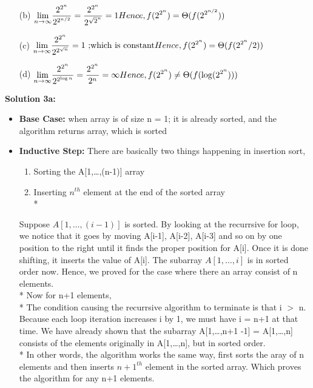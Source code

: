 \documentclass{article}
\theoremstyle{definition}
\begin{document}
\begin{itemize}
\begin{enumerate}
				\item[(b)] $\displaystyle{\lim_{n \to \infty}} \frac {2^{2^{n}}}{2^{2^{n/2}}} = \frac {2^{2^{n}}}{2^{\sqrt 2 ^{n}}} = 1 \bigskip\\*
				 Hence, f(2^{2^{n}}) = \Theta(f(2^{2^{n/2}}))$
				\item[(c)] $\displaystyle{\lim_{n \to \infty}} \frac {2^{2^{n}}}{2^{2^{\sqrt n}}} = 1  {\text{ ;which is constant}} \bigskip\\*
				 Hence, f(2^{2^{n}}) = \Theta(f(2^{2^{n}}/2))$
				\item[(d)] $\displaystyle{\lim_{n \to \infty}} \frac {2^{2^{n}}}{2^{2^{\log n}}} =  \frac {2^{2^{n}}}{2^{n}} = \infty \bigskip\\*
				 Hence, f(2^{2^{n}}) \neq \Theta(f(\log (2^{2^{n}})))$
		          \end{enumerate}
  	 \end{itemize}

\textbf{Solution 3a:} 
	\begin{itemize}
		\item \textbf{Base Case:} when array is of size n = 1; it is already sorted, and the algorithm returns array, which is sorted
		\item \textbf{Inductive Step:}
			There are basically two things happening in insertion sort,
			\begin{enumerate}
				\item Sorting the A[1,\ldots,(n-1)] array
				\item Inserting $n^{th}$ element at the end of the sorted array \\*
			\end{enumerate}
		Suppose $A[1,\ldots,(i-1)]$ is sorted. By looking at the recurrsive for loop, we notice that it goes by moving A[i-1], A[i-2], A[i-3] and so on by one position to the right until it finds the proper position for A[i]. Once it is done shifting, it inserts the value of A[i]. The subarray $A[1,\ldots,i]$ is in sorted order now. Hence, we proved for the case where there an array consist of n elements.\bigskip\\*
		Now for n+1 elements, \\*
		The condition causing the recurrsive algorithm to terminate is that i $>$ n. Because each loop iteration increases i by 1, we must have i = n+1 at that time. We have already shown that the subarray A[1,\ldots,n+1 -1] = A[1,\ldots,n] consists of the elements originally in A[1,\ldots,n], but in sorted order. \\*
		In other words, the algorithm works the same way, first sorts the aray of n elements and then inserts $n+1^{th}$ element in the sorted array. Which proves the algorithm for any n+1 elements.
	\end{itemize}
\end{document}
